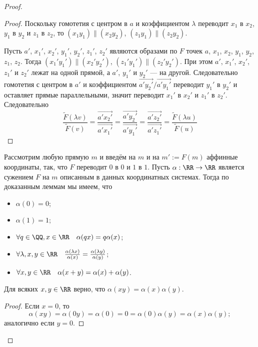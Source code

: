 \documentclass[12pt,a4paper]{article}
\begin{document}
\begin{proof}
\begin{proof}
            Поскольку гомотетия с центром в $a$ и коэффициентом $\lambda$ переводит $x_1$ в $x_2$, $y_1$ в $y_2$ и $z_1$ в $z_2$, то $(x_1y_1) \parallel (x_2y_2)$, $(z_1y_1) \parallel (z_2y_2)$.

            Пусть $a'$, $x_1'$, $x_2'$, $y_1'$, $y_2'$, $z_1'$, $z_2'$ являются образами по $F$ точек $a$, $x_1$, $x_2$, $y_1$, $y_2$, $z_1$, $z_2$. Тогда $(x_1'y_1') \parallel (x_2'y_2')$, $(z_1'y_1') \parallel (z_2'y_2')$. При этом $a'$, $x_1'$, $x_2'$, $z_1'$ и $z_2'$ лежат на одной прямой, а $a'$, $y_1'$ и $y_2'$ --- на другой. Следовательно гомотетия с центром в $a'$ и коэффициентом $\overrightarrow{a'y_2'}/\overrightarrow{a'y_1'}$ переводит $y_1'$ в $y_2'$ и оставляет прямые параллельными, значит переводит $x_1'$ в $x_2'$ и $z_1'$ в $z_2'$. Следовательно
            \[
                \frac{\widetilde{F}(\lambda v)}{\widetilde{F}(v)}
                = \frac{\overrightarrow{a'x_2'}}{\overrightarrow{a'x_1'}}
                = \frac{\overrightarrow{a'y_2'}}{\overrightarrow{a'y_1'}}
                = \frac{\overrightarrow{a'z_2'}}{\overrightarrow{a'z_1'}}
                = \frac{\widetilde{F}(\lambda u)}{\widetilde{F}(u)}
            \]
        \end{proof}

        Рассмотрим любую прямую $m$ и введём на $m$ и на $m' := F(m)$ аффинные координаты, так, что $F$ переводит $0$ в $0$ и $1$ в $1$. Пусть $\alpha: \RR \to \RR$ является сужением $F$ на $m$ описанным в данных координатных системах. Тогда по доказанным леммам мы имеем, что
        \begin{itemize}
            \item $\alpha(0) = 0$;
            \item $\alpha(1) = 1$;
            \item $\forall q \in \QQ, x \in \RR \quad \alpha(qx) = q \alpha(x)$;
            \item $\forall \lambda, x, y \in \RR \quad \frac{\alpha(\lambda x)}{\alpha(x)} = \frac{\alpha(\lambda y)}{\alpha(y)}$;
            \item $\forall x, y \in \RR \quad \alpha(x + y) = \alpha(x) + \alpha(y)$.
        \end{itemize}

        \begin{thlemma}
            Для всяких $x, y \in \RR$ верно, что $\alpha(xy) = \alpha(x) \alpha(y)$. 
        \end{thlemma}

        \begin{proof}
            Если $x = 0$, то
            \[
                \alpha(xy)
                = \alpha(0y)
                = \alpha(0)
                = 0
                = \alpha(0) \alpha(y)
                = \alpha(x) \alpha(y);
            \]
            аналогично если $y = 0$.


\end{proof}
\end{proof}
\end{document}

